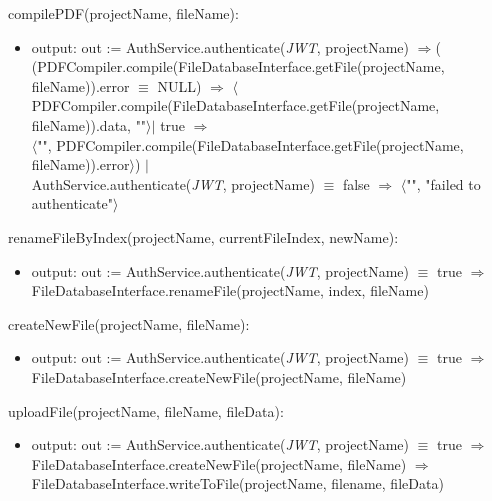 \documentclass[12pt, titlepage]{article}
\begin{document}
	\noindent compilePDF(projectName, fileName):
	\begin{itemize}
		
		\item output: out :=
		AuthService.authenticate(\textit{JWT}, projectName) $\Rightarrow$(\\
		(PDFCompiler.compile(FileDatabaseInterface.getFile(projectName, fileName)).error $\equiv$ NULL) $\Rightarrow$
		$\langle$\\PDFCompiler.compile(FileDatabaseInterface.getFile(projectName, fileName)).data, ""$\rangle |$
		true $\Rightarrow$\\
		$\langle$"", PDFCompiler.compile(FileDatabaseInterface.getFile(projectName, fileName)).error$\rangle$) $|$\\
		AuthService.authenticate(\textit{JWT}, projectName) $\equiv$ false $\Rightarrow$ $\langle$"", "failed to authenticate"$\rangle$
		
	\end{itemize}
	
	\noindent renameFileByIndex(projectName, currentFileIndex, newName):
	\begin{itemize}
		
		\item output: out :=
		AuthService.authenticate(\textit{JWT}, projectName) $\equiv$ true $\Rightarrow$ \\ FileDatabaseInterface.renameFile(projectName, index, fileName)
		
	\end{itemize}
	
	\noindent createNewFile(projectName, fileName):
	\begin{itemize}
		
		\item output: out :=
		AuthService.authenticate(\textit{JWT}, projectName) $\equiv$ true $\Rightarrow$ \\ FileDatabaseInterface.createNewFile(projectName, fileName)
		
	\end{itemize}
	
	\noindent uploadFile(projectName, fileName, fileData):
	\begin{itemize}
		
		\item output: out :=
		AuthService.authenticate(\textit{JWT}, projectName) $\equiv$ true $\Rightarrow$ \\
		FileDatabaseInterface.createNewFile(projectName, fileName) $\Rightarrow$ \\ FileDatabaseInterface.writeToFile(projectName, filename, fileData)
		
	\end{itemize}
	
\end{document}
